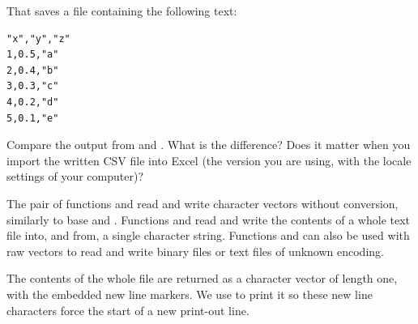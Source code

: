 \documentclass[krantz2]{krantz}\usepackage{knitr}
\begin{document}
\begin{knitrout}\footnotesize
{}\color{fgcolor}\begin{kframe}
\begin{alltt}
  \hlstd{=} \hlstd{)}
\hlstd{(}\hlstd{,}  \hlstd{=} \hlstd{)}
\end{alltt}
\end{kframe}
\end{knitrout}

That saves a file containing the following text:
\begin{knitrout}\footnotesize
{}\color{fgcolor}\begin{kframe}
\begin{verbatim}
"x","y","z"
1,0.5,"a"
2,0.4,"b"
3,0.3,"c"
4,0.2,"d"
5,0.1,"e"
\end{verbatim}
\end{kframe}
\end{knitrout}

\begin{playground}
Compare the output from  and . What is the difference? Does it matter when you import the written CSV file into Excel (the version you are using, with the locale settings of your computer)?
\end{playground}

The pair of functions  and  read and write character vectors without conversion, similarly to base \Rlang {} and . Functions  and  read and write the contents of a whole text file into, and from, a single character string. Functions  and  can also be used with raw vectors to read and write binary files or text files of unknown encoding.

The contents of the whole file are returned as a character vector of length one, with the embedded new line markers. We use  to print it so these new line characters force the start of a new print-out line.
\end{document}
